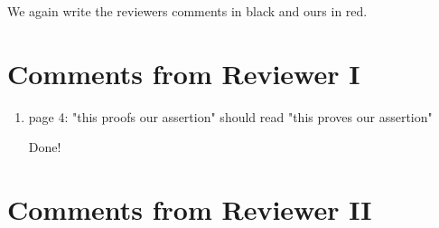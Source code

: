 \documentclass{article}
\begin{document}
We again write the reviewers comments in black and ours in {\color{mred} red}.

\section*{Comments from Reviewer I}

\begin{enumerate}
    \item  page 4: "this proofs our assertion" should read "this proves our assertion"

    {\color{mred}Done!}
\end{enumerate}

\section*{Comments from Reviewer II}
\end{document}
